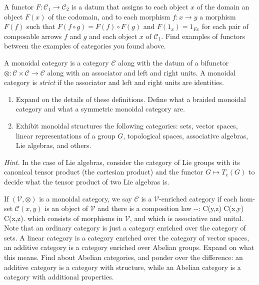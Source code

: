 \documentclass[fleqn, a4paper, twoside]{article}
\makeatletter
\newcommand{\0}{\langle 0\rangle}
\let\[\@undefined
\DeclareRobustCommand{\[}{\begin{equation}}%
\let\]\@undefined
\DeclareRobustCommand{\]}{\end{equation}}%
\theoremstyle{mytheorem}
\theoremstyle{introthm}
\theoremstyle{mydefinition}
\theoremstyle{mydefinition2}
\theoremstyle{plain} %
\newcommand{\?}{\,?\,}
\theoremstyle{mytheorem}
\theoremstyle{plain} %
\makeatother
\begin{document}
\begin{question} A functor $F: \mathcal{C}_1\longrightarrow 
\mathcal{C}_2$ is a datum that assigns to each object
$x$ of the domain an object $F(x)$ of the codomain,
and to each morphism $f:x\to y$ a morphism $F(f)$ such
that $F(f\circ g) = F(f) \circ F(g)$ and $F(1_x) = 1_{Fx}$
for each pair of composable arrows $f$ and $g$ and each
object $x$ of $\mathcal C_1$. Find examples of functors
between the examples of categories you found above.

\end{question}
\begin{question} A monoidal category is a category $\mathcal C$ 
along with the datum of a bifunctor $\otimes :
\mathcal{C}\times \mathcal{C}\longrightarrow \mathcal{C}$
along with an associator and left and right units. 
A monoidal category is \emph{strict} if the associator and left
and right units are identities.
\begin{enumerate}
\item Expand on the details of these definitions. Define what
a braided monoidal category and what a symmetric monoidal category are.
\item Exhibit monoidal
structures the following categories: sets, vector spaces,
linear representations of a group $G$, topological spaces,
associative algebras, Lie algebras, and others.
\end{enumerate}
 \emph{Hint.} In the case of Lie algebras,
 consider the category of Lie groups with its
 canonical tensor product (the cartesian product) 
 and the functor $G\longmapsto T_e(G)$ to decide
 what the tensor product of two Lie algebras is.
\end{question}


\begin{question}
If $(\mathcal{V},\otimes)$ is a monoidal category, we say $\mathcal{C}$ 
is a $\mathcal V$-enriched category if each hom-set 
$\mathcal{C}(x,y)$ is an object of $\mathcal{V}$ and
there is a composition law 
\[-\circ -: \mathcal C(y,z) \otimes  \mathcal C(x,y) 
	\longrightarrow \mathcal C(x,z). \] 
which consists of morphisms in $\mathcal{V}$, and which is 
associative and unital. Note that an ordinary category is
just a category enriched over the category of sets.
A linear category is a category enriched over the
category of vector spaces, an additive category is a
category enriched over Abelian groups.
Expand on what this means. Find about Abelian
categories, and ponder over the difference: an additive
category is a category with structure, while an
Abelian category is a category with additional properties.
\end{question}
\end{document}
